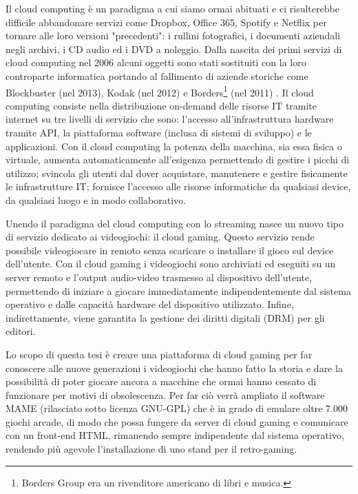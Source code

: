 Il cloud computing è un paradigma a cui siamo ormai abituati e ci risulterebbe difficile abbandonare servizi come Dropbox, Office 365, Spotify e Netflix per tornare alle loro versioni "precedenti": i rullini fotografici, i documenti aziendali negli archivi, i CD audio ed i DVD a noleggio. Dalla nascita dei primi servizi di cloud computing nel 2006 alcuni oggetti sono stati sostituiti con la loro controparte informatica portando al fallimento di aziende storiche come Blockbuster (nel 2013), Kodak (nel 2012) e Borders\footnote{Borders Group era un rivenditore americano di libri e musica.} (nel 2011) \parencite{I_4_fallimenti_più_clamorosi_del_decennio}. Il cloud computing consiste nella distribuzione on-demand delle risorse IT tramite internet su tre livelli di servizio che sono: l'accesso all'infrastruttura hardware tramite API, la piattaforma software (inclusa di sistemi di sviluppo) e le applicazioni. Con il cloud computing la potenza della macchina, sia essa fisica o virtuale, aumenta automaticamente all'esigenza permettendo di gestire i picchi di utilizzo; svincola gli utenti dal dover acquistare, manutenere e gestire fisicamente le infrastrutture IT; fornisce l'accesso alle risorse informatiche da qualsiasi device, da qualsiasi luogo e in modo collaborativo.

Unendo il paradigma del cloud computing con lo streaming nasce un nuovo tipo di servizio dedicato ai videogiochi: il cloud gaming. Questo servizio rende possibile videogiocare in remoto senza scaricare o installare il gioco sul device dell'utente. Con il cloud gaming i videogiochi sono archiviati ed eseguiti su un server remoto e l'output audio-video trasmesso al dispositivo dell'utente, permettendo di iniziare a giocare immediatamente indipendentemente dal sistema operativo e dalle capacità hardware del dispositivo utilizzato. Infine, indirettamente, viene garantita la gestione dei diritti digitali (DRM) per gli editori.

Lo scopo di questa tesi è creare una piattaforma di cloud gaming per far conoscere alle nuove generazioni i videogiochi che hanno fatto la storia e dare la possibilità di poter giocare ancora a macchine che  ormai hanno cessato di funzionare per motivi di obsolescenza. Per far ciò verrà ampliato il software MAME (rilasciato sotto licenza GNU-GPL) che è in grado di emulare oltre 7.000 giochi arcade, di modo che possa fungere da server di cloud gaming e comunicare con un front-end HTML, rimanendo sempre indipendente dal sistema operativo, rendendo più agevole l’installazione di uno stand per il retro-gaming.


